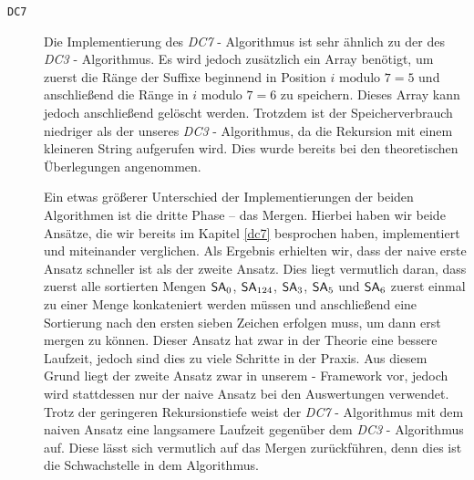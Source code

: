 \begin{description}
	\item[\texttt{DC7}]

	Die Implementierung des \emph{DC7} - Algorithmus ist sehr ähnlich zu der des \emph{DC3} - Algorithmus. Es wird jedoch zusätzlich ein Array benötigt, um zuerst die Ränge der Suffixe beginnend in Position $i \text{ modulo } 7 = 5$ und anschließend die Ränge in $i \text{ modulo } 7 = 6$ zu speichern. Dieses Array kann jedoch anschließend gelöscht werden.
	Trotzdem ist der Speicherverbrauch niedriger als der unseres \emph{DC3} - Algorithmus, da die Rekursion mit einem kleineren String aufgerufen wird. Dies wurde bereits bei den theoretischen Überlegungen angenommen.

	Ein etwas größerer Unterschied der Implementierungen der beiden Algorithmen ist die dritte Phase -- das Mergen. Hierbei haben wir beide Ansätze, die wir bereits im Kapitel \ref{dc7} besprochen haben, implementiert und miteinander verglichen. Als Ergebnis erhielten wir, dass der naive erste Ansatz schneller ist als der zweite Ansatz. Dies liegt vermutlich daran, dass zuerst alle sortierten Mengen $\sa_0$, $\sa_{124}$, $\sa_3$, $\sa_5$ und  $\sa_6$ zuerst einmal zu einer Menge konkateniert werden müssen und anschließend eine Sortierung nach den ersten sieben Zeichen erfolgen muss, um dann erst mergen zu können. Dieser Ansatz hat zwar in der Theorie eine bessere Laufzeit, jedoch sind dies zu viele Schritte in der Praxis. Aus diesem Grund liegt der zweite Ansatz zwar in unserem \sacabench - Framework vor, jedoch wird stattdessen nur der naive Ansatz bei den Auswertungen verwendet.
	Trotz der geringeren Rekursionstiefe weist der \emph{DC7} - Algorithmus mit dem naiven Ansatz eine langsamere Laufzeit gegenüber dem \emph{DC3} - Algorithmus auf. Diese lässt sich vermutlich auf das Mergen zurückführen, denn dies ist die Schwachstelle in dem Algorithmus.

\end{description}
